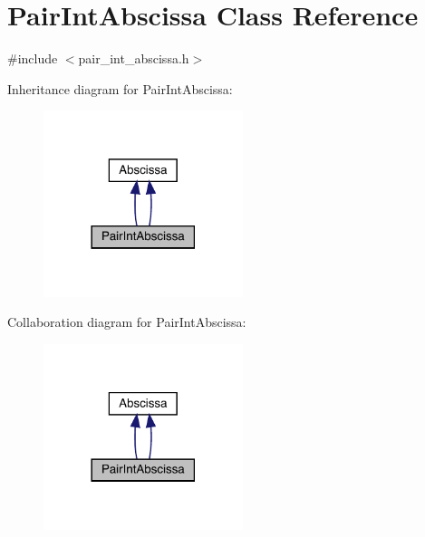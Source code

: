 \hypertarget{classPairIntAbscissa}{}\section{Pair\+Int\+Abscissa Class Reference}
\label{classPairIntAbscissa}


{\ttfamily \#include $<$pair\+\_\+int\+\_\+abscissa.\+h$>$}



Inheritance diagram for Pair\+Int\+Abscissa\+:
\nopagebreak
\begin{figure}[H]
\begin{center}
\leavevmode
\includegraphics[width=165pt]{d5/d16/classPairIntAbscissa__inherit__graph}
\end{center}
\end{figure}


Collaboration diagram for Pair\+Int\+Abscissa\+:
\nopagebreak
\begin{figure}[H]
\begin{center}
\leavevmode
\includegraphics[width=165pt]{da/d9c/classPairIntAbscissa__coll__graph}
\end{center}
\end{figure}
